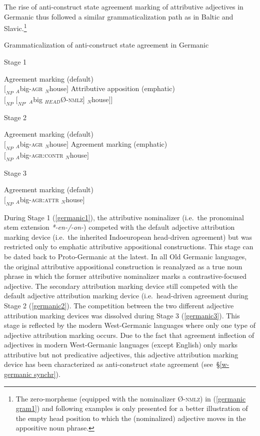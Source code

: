 {The rise of anti-construct state agreement marking of attributive adjectives in Germanic thus followed a similar grammaticalization path as in Baltic and Slavic.\footnote{The zero-morpheme (equipped with the nominalizer Ø-\textsc{nmlz}) in (\ref{germanic gram1}) and following examples is only presented for a better illustration of the empty head position to which the (nominalized) adjective moves in the appositive noun phrase.}
\begin{exe}
\ex \label{germanic gram1} Grammaticalization of anti-construct state agreement in Germanic
\begin{xlist}
\ex	Stage 1 \label{germanic1}
\begin{xlist}
\ex	Agreement marking (default)\\
$[_{NP}$ $_{A}$big-\textsc{agr} $_{N}$house$]$
\ex Attributive apposition (emphatic)\\
$[_{NP}$ $[_{NP'}$ $_{A}$big $_{HEAD}$Ø-\textsc{nmlz}$]$ $_{N}$house$] ]$\label{germanic art1}
\end{xlist}
\ex 	Stage 2 \label{germanic2}
\begin{xlist}
\ex	Agreement marking (default) \\
$[_{NP}$ $_{A}$big-\textsc{agr} $_{N}$house$]$
\ex	Agreement marking (emphatic) \\
$[_{NP}$ $_{A}$big-\textsc{agr:contr} $_{N}$house$]$\label{germanic ACAgr}
\end{xlist}
\ex 	Stage 3 \label{germanic3}
\begin{xlist}
\ex 	Agreement marking (default)\\
$[_{NP}$ $_{A}$big-\textsc{agr:attr} $_{N}$house$]$
\end{xlist}
\end{xlist}
\end{exe}
During Stage 1 (\ref{germanic1}), the attributive nominalizer (i.e.~the pronominal stem extension \textit{*-en-/-on-}) competed with the default adjective attribution marking device (i.e.~the inherited Indoeuropean head-driven agreement) but was restricted only to emphatic attributive appositional constructions. This stage can be dated back to Proto-Germanic at the latest. In all Old Germanic languages, the original attributive appositional construction is reanalyzed as a true noun phrase in which the former attributive nominalizer marks a contrastive-focused adjective. The secondary attribution marking device still competed with the default adjective attribution marking device (i.e.~head-driven agreement during Stage 2 (\ref{germanic2}). The competition between the two different adjective attribution marking devices was dissolved during Stage 3 (\ref{germanic3}). This stage is reflected by the modern West-Germanic languages where only one type of adjective attribution marking occurs. Due to the fact that agreement inflection of adjectives in modern West-Germanic languages (except English) only marks attributive but not predicative adjectives, this adjective attribution marking device has been characterized as anti-construct state agreement (see~\S\ref{w-germanic synchr}).

}

